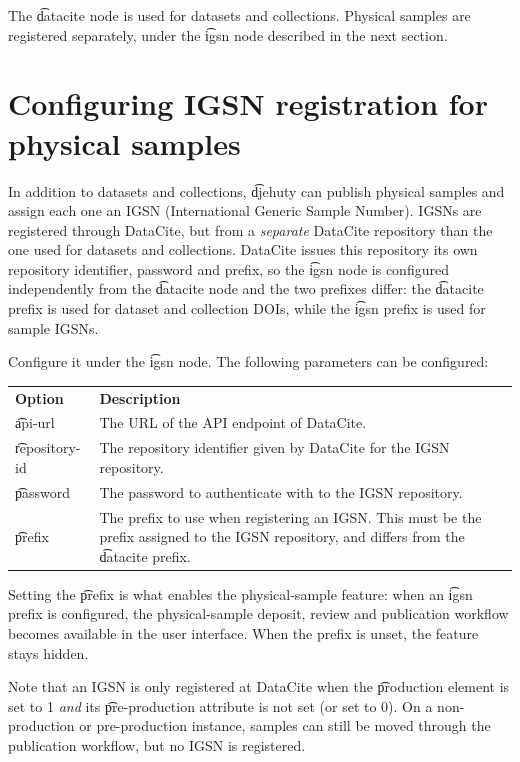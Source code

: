   The \t{datacite} node is used for datasets and collections.  Physical
  samples are registered separately, under the \t{igsn} node described in
  the next section.

\section{Configuring IGSN registration for physical samples}

  In addition to datasets and collections, \t{djehuty} can publish physical
  samples and assign each one an IGSN (International Generic Sample Number).
  IGSNs are registered through DataCite, but from a \emph{separate} DataCite
  repository than the one used for datasets and collections.  DataCite issues
  this repository its own repository identifier, password and prefix, so the
  \t{igsn} node is configured independently from the \t{datacite} node and
  the two prefixes differ: the \t{datacite} prefix is used for dataset and
  collection DOIs, while the \t{igsn} prefix is used for sample IGSNs.

  Configure it under the \t{igsn} node.  The following parameters can be
  configured:

\begin{tabularx}{\textwidth}{*{1}{!{\VRule[-1pt]}l}!{\VRule[-1pt]}X}
  \headrow
  \textbf{Option}             & \textbf{Description}\\
  \t{api-url}                 & The URL of the API endpoint of DataCite.\\
  \t{repository-id}           & The repository identifier given by DataCite
                                for the IGSN repository.\\
  \t{password}                & The password to authenticate with to the IGSN
                                repository.\\
  \t{prefix}                  & The prefix to use when registering an IGSN.
                                This must be the prefix assigned to the IGSN
                                repository, and differs from the \t{datacite}
                                prefix.
\end{tabularx}

  Setting the \t{prefix} is what enables the physical-sample feature: when an
  \t{igsn} prefix is configured, the physical-sample deposit, review and
  publication workflow becomes available in the user interface.  When the
  prefix is unset, the feature stays hidden.

  Note that an IGSN is only registered at DataCite when the \t{production}
  element is set to 1 \emph{and} its \t{pre-production} attribute is not set
  (or set to 0).  On a non-production or pre-production instance, samples can
  still be moved through the publication workflow, but no IGSN is registered.


